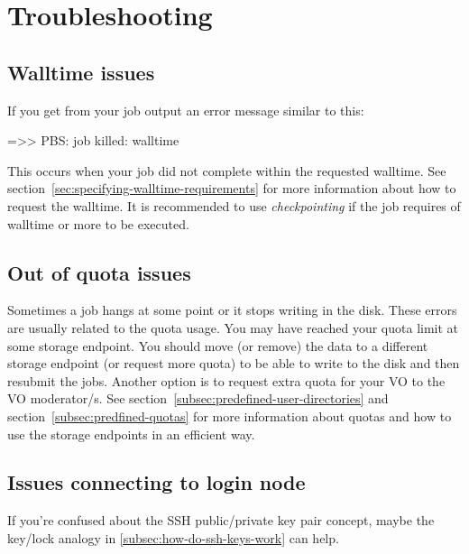 \chapter{Troubleshooting}
\label{ch:troubleshooting}



\section{Walltime issues}
If you get from your job output an error message similar to this:

\begin{prompt}
 =>> PBS: job killed: walltime %
\end{prompt}

This occurs when your job did not complete within the requested walltime.
See section~\ref{sec:specifying-walltime-requirements} for more information about how to request the walltime.
It is recommended to use \emph{checkpointing} if the job requires  of walltime or more to be executed.



\section{Out of quota issues}

Sometimes a job hangs at some point or it stops writing in the disk. These errors are usually
related to the quota usage. You may have reached your quota limit at some storage endpoint.
You should move (or remove) the data to a different storage endpoint (or request more quota) to be able to write to the disk and then resubmit the jobs.
\ifgent
Another option is to request extra quota for your VO to the VO moderator/s.
See section~\ref{subsec:predefined-user-directories} and section~\ref{subsec:predfined-quotas} for more information about
quotas and how to use the storage endpoints in an efficient way.
\fi

\section{Issues connecting to login node}
\label{sec:connecting-issues}

If you're confused about the SSH public/private key pair concept, maybe the
key/lock analogy in \autoref{subsec:how-do-ssh-keys-work} can help.

